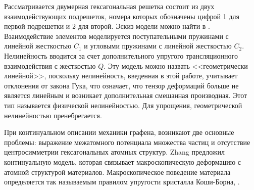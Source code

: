 Рассматривается двумерная гексагональная решетка состоит из двух взаимодействующих подрешеток, номера которых обозначены цифрой 1 для первой подрешетки и 2 для второй. Эскиз модели можно найти в \cite {poros19}.  Взаимодействие элементов моделируется поступательными пружинами с линейной жесткостью $C_1$ и угловыми пружинами с линейной жесткостью $C_2$. Нелинейность вводится за счет дополнительного упругого трансляционного взаимодействия с жесткостью $Q$. Эту модель можно назвать <<геометрически линейной>>, поскольку нелинейность, введенная в этой работе, учитывает отклонения от закона Гука, что означает, что тензор деформаций больше не является линейным и возникает дополнительная смешанная производная. Этот тип называется физической нелинейностью. Для упрощения, геометрической нелинейностью пренебрегается.

При континуальном описании механики графена, возникают две основные проблемы: выражение межатомного потенциала множества частиц и отсутствие центросимметрии гексагональных атомных структур. Zhang \cite{Zhang} предложил континуальную модель, которая связывает макроскопическую деформацию с атомной структурой материалов. Макроскопическое поведение материала определяется так называемым правилом упругости кристалла Коши-Борна, .

